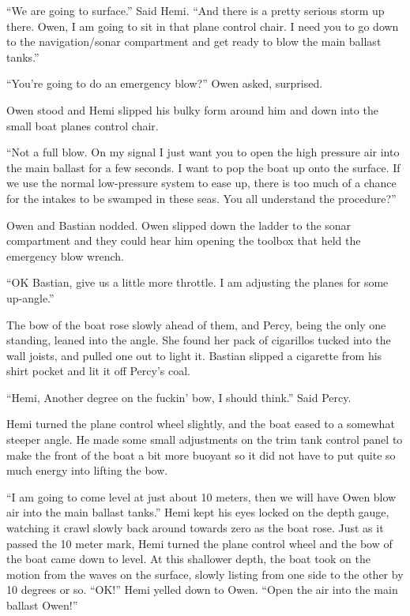 \documentclass[]{scrbook}
\begin{document}
``We are going to surface.'' Said Hemi. ``And there is a pretty serious
storm up there. Owen, I am going to sit in that plane control chair. I
need you to go down to the navigation/sonar compartment and get ready to
blow the main ballast tanks.''

``You're going to do an emergency blow?'' Owen asked, surprised.

Owen stood and Hemi slipped his bulky form around him and down into the
small boat planes control chair.

``Not a full blow. On my signal I just want you to open the high
pressure air into the main ballast for a few seconds. I want to pop the
boat up onto the surface. If we use the normal low-pressure system to
ease up, there is too much of a chance for the intakes to be swamped in
these seas. You all understand the procedure?''

Owen and Bastian nodded. Owen slipped down the ladder to the sonar
compartment and they could hear him opening the toolbox that held the
emergency blow wrench.

``OK Bastian, give us a little more throttle. I am adjusting the planes
for some up-angle.''

The bow of the boat rose slowly ahead of them, and Percy, being the only
one standing, leaned into the angle. She found her pack of cigarillos
tucked into the wall joists, and pulled one out to light it. Bastian
slipped a cigarette from his shirt pocket and lit it off Percy's coal.

``Hemi, Another degree on the fuckin' bow, I should think.'' Said Percy.

Hemi turned the plane control wheel slightly, and the boat eased to a
somewhat steeper angle. He made some small adjustments on the trim tank
control panel to make the front of the boat a bit more buoyant so it did
not have to put quite so much energy into lifting the bow.

``I am going to come level at just about 10 meters, then we will have
Owen blow air into the main ballast tanks.'' Hemi kept his eyes locked
on the depth gauge, watching it crawl slowly back around towards zero as
the boat rose. Just as it passed the 10 meter mark, Hemi turned the
plane control wheel and the bow of the boat came down to level. At this
shallower depth, the boat took on the motion from the waves on the
surface, slowly listing from one side to the other by 10 degrees or so.
``OK!'' Hemi yelled down to Owen. ``Open the air into the main ballast
Owen!''
\end{document}

